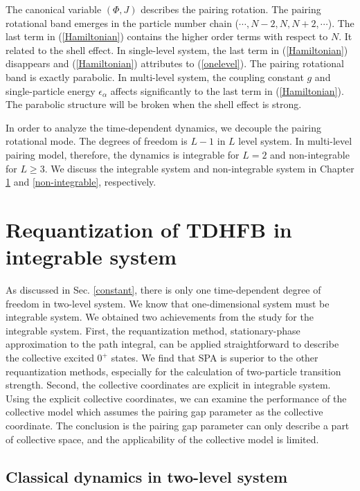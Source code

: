 \documentclass[11pt]{book} %
\begin{document}
The canonical variable $(\Phi,J)$ describes the pairing rotation. The pairing rotational band emerges in the particle number chain ($\cdots,N-2,N,N+2,\cdots$). The last term in (\ref{Hamiltonian}) contains the higher order terms with respect to $N$. It related to the shell effect. In single-level system, the last term in (\ref{Hamiltonian}) disappears and (\ref{Hamiltonian}) attributes to (\ref{onelevel}). The pairing rotational band is exactly parabolic. In multi-level system, the coupling constant $g$ and single-particle energy $\epsilon_{\alpha}$ affects significantly to the last term in (\ref{Hamiltonian}). The parabolic structure will be broken when the shell effect is strong. 

In order to analyze the time-dependent dynamics, we decouple the pairing rotational mode. The degrees of freedom is $L-1$ in $L$ level system. In multi-level pairing model, therefore, the dynamics is integrable for $L=2$ and non-integrable for $L\ge 3$. We discuss the integrable system and non-integrable system in Chapter \ref{integrable} and \ref{non-integrable}, respectively. 

\clearpage{\pagestyle{empty}\cleardoublepage}
\chapter{Requantization of TDHFB in integrable system}
\label{integrable}
As discussed in Sec. \ref{constant}, there is only one time-dependent degree of freedom in two-level system. We know that one-dimensional system must be integrable system.
We obtained two achievements from the study for the integrable system. First, the requantization method, stationary-phase approximation to the path integral, can be applied straightforward to describe the collective excited $0^+$ states. We find that SPA is superior to the other requantization methods, especially for the calculation of two-particle transition strength. Second, the collective coordinates are explicit in integrable system. Using the explicit collective coordinates, we can examine the performance of the collective model which assumes the pairing gap parameter as the collective coordinate. The conclusion is the pairing gap parameter can only describe a part of collective space, and the applicability of the collective model is limited.

\section{Classical dynamics in two-level system}
\end{document}
